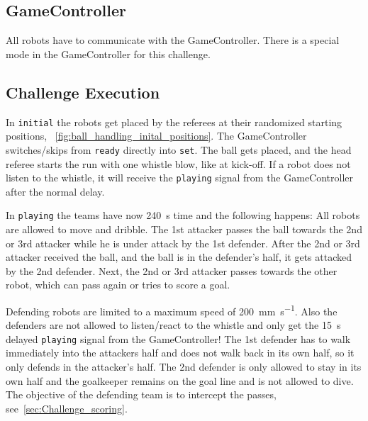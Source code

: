 \subsection{GameController}
All robots have to communicate with the GameController. There is a special mode in the GameController for this challenge. 

\subsection{Challenge Execution}

In \texttt{initial} the robots get placed by the referees at their randomized starting positions, \cf~\cref{fig:ball_handling_inital_positions}. The GameController switches/skips from \texttt{ready} directly into \texttt{set}. The ball gets placed, and the head referee starts the run with one whistle blow, like at kick-off. If a robot does not listen to the whistle, it will receive the \texttt{playing} signal from the GameController after the normal delay.

In \texttt{playing} the teams have now \qty{240}{\second} time and the following happens: All robots are allowed to move and dribble. The 1st attacker passes the ball towards the 2nd or 3rd attacker while he is under attack by the 1st defender. After the 2nd or 3rd attacker received the ball, and the ball is in the defender's half, it gets attacked by the 2nd defender. Next, the 2nd or 3rd attacker passes towards the other robot, which can pass again or tries to score a goal.

Defending robots are limited to a maximum speed of \qty{200}{\mm \per \second}. Also the defenders are not allowed to listen/react to the whistle and only get the \qty{15}{\second} delayed \texttt{playing} signal from the GameController! The 1st defender has to walk immediately into the attackers half and does not walk back in its own half, so it only defends in the attacker's half. The 2nd defender is only allowed to stay in its own half and the goalkeeper remains on the goal line and is not allowed to dive. The objective of the defending team is to intercept the passes, see~\cref{sec:Challenge_scoring}.

